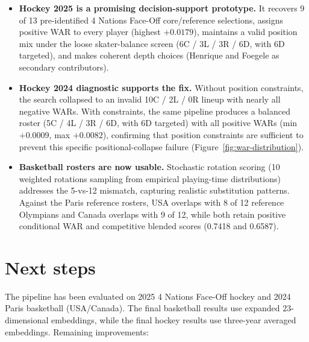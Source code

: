 \documentclass[11pt,letterpaper]{article}
\begin{document}
\begin{itemize}[leftmargin=*]
  \item \textbf{Hockey 2025 is a promising decision-support prototype.}
    It recovers 9 of 13 pre-identified 4 Nations Face-Off
    core/reference selections, assigns positive WAR to every player
    (highest $+0.0179$), maintains a valid position mix under the loose
    skater-balance screen (6C / 3L / 3R / 6D, with 6D targeted), and
    makes coherent depth choices (Henrique and Foegele as secondary
    contributors).
  \item \textbf{Hockey 2024 diagnostic supports the fix.} Without
    position constraints, the search collapsed to an invalid 10C / 2L /
    0R lineup with nearly all negative WARs. With constraints, the same
    pipeline produces a balanced roster (5C / 4L / 3R / 6D, with 6D
    targeted) with all positive WARs (min $+0.0009$, max $+0.0082$),
    confirming that
    position constraints are sufficient to prevent this specific
    positional-collapse failure (Figure~\ref{fig:war-distribution}).
  \item \textbf{Basketball rosters are now usable.} Stochastic rotation
    scoring (10 weighted rotations sampling from empirical playing-time
    distributions) addresses the 5-vs-12 mismatch, capturing realistic
    substitution patterns. Against the Paris reference rosters, USA
    overlaps with 8 of 12 reference Olympians and Canada overlaps with 9
    of 12, while both retain positive conditional WAR and competitive
    blended scores (0.7418 and 0.6587).
\end{itemize}

\section{Next steps}

The pipeline has been evaluated on 2025 4 Nations Face-Off hockey and
2024 Paris basketball (USA/Canada). The final basketball results use
expanded $23$-dimensional embeddings, while the final hockey results use
three-year averaged embeddings. Remaining improvements:
\end{document}
